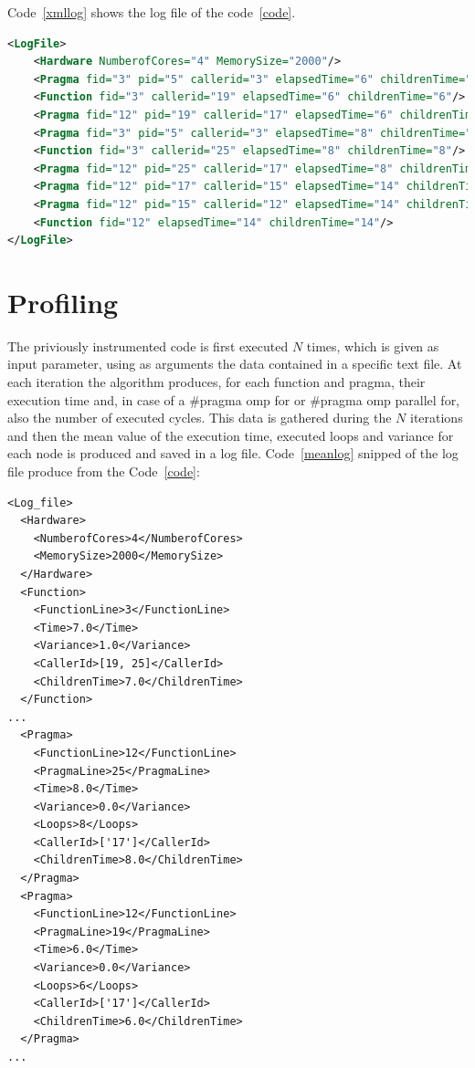 \documentclass[a4paper,11pt,oneside]{book}
\begin{document}
Code~\ref{xmllog} shows the log file of the code~\ref{code}.

\begin{lstlisting}[language=XML, caption=XML file of the pragma structure of Code~\ref{code}., label=xmllog]
<LogFile>
	<Hardware NumberofCores="4" MemorySize="2000"/>
	<Pragma fid="3" pid="5" callerid="3" elapsedTime="6" childrenTime="0" loops="6"/>
	<Function fid="3" callerid="19" elapsedTime="6" childrenTime="6"/>
	<Pragma fid="12" pid="19" callerid="17" elapsedTime="6" childrenTime="6"/>
	<Pragma fid="3" pid="5" callerid="3" elapsedTime="8" childrenTime="0" loops="8"/>
	<Function fid="3" callerid="25" elapsedTime="8" childrenTime="8"/>
	<Pragma fid="12" pid="25" callerid="17" elapsedTime="8" childrenTime="8"/>
	<Pragma fid="12" pid="17" callerid="15" elapsedTime="14" childrenTime="14"/>
	<Pragma fid="12" pid="15" callerid="12" elapsedTime="14" childrenTime="14"/>
	<Function fid="12" elapsedTime="14" childrenTime="14"/>
</LogFile>
\end{lstlisting}


\section{Profiling}

The priviously instrumented code is first executed $N$ times, which is given as input parameter, using as arguments the data contained in a specific text file. At each iteration the algorithm produces, for each function and pragma, their execution time and, in case of a $\#$pragma omp for or $\#$pragma omp parallel for, also the number of executed cycles. This data is gathered during the $N$ iterations and then the mean value of the execution time, executed loops and variance for each node is produced and saved in a log file. 
Code~\ref{meanlog} snipped of the log file produce from the Code~\ref{code}:

\lstset{language=XML}
\begin{lstlisting}[caption=Profile XML file, label=meanlog]
<Log_file>
  <Hardware>
    <NumberofCores>4</NumberofCores>
    <MemorySize>2000</MemorySize>
  </Hardware>
  <Function>
    <FunctionLine>3</FunctionLine>
    <Time>7.0</Time>
    <Variance>1.0</Variance>
    <CallerId>[19, 25]</CallerId>
    <ChildrenTime>7.0</ChildrenTime>
  </Function>
...
  <Pragma>
    <FunctionLine>12</FunctionLine>
    <PragmaLine>25</PragmaLine>
    <Time>8.0</Time>
    <Variance>0.0</Variance>
    <Loops>8</Loops>
    <CallerId>['17']</CallerId>
    <ChildrenTime>8.0</ChildrenTime>
  </Pragma>
  <Pragma>
    <FunctionLine>12</FunctionLine>
    <PragmaLine>19</PragmaLine>
    <Time>6.0</Time>
    <Variance>0.0</Variance>
    <Loops>6</Loops>
    <CallerId>['17']</CallerId>
    <ChildrenTime>6.0</ChildrenTime>
  </Pragma>
...
\end{lstlisting}
\end{document}
